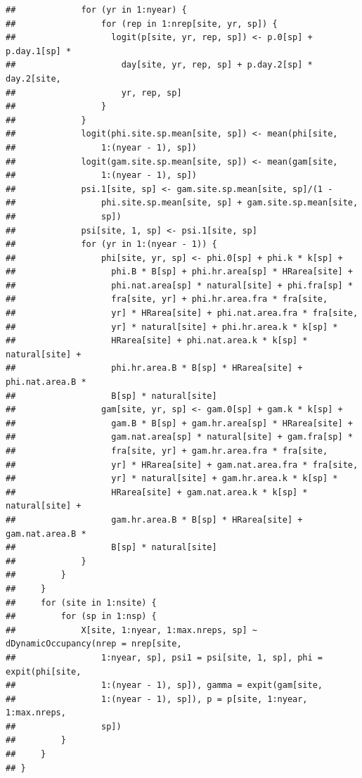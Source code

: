 \documentclass{article}\usepackage[]{graphicx}\usepackage[]{color}
\makeatletter
\newenvironment{kframe}{%
 \def\at@end@of@kframe{}%
 \ifinner\ifhmode%
  \def\at@end@of@kframe{\end{minipage}}%
  \begin{minipage}{\columnwidth}%
 \fi\fi%
 \def\FrameCommand##1{\hskip\@totalleftmargin \hskip-\fboxsep
 \colorbox{shadecolor}{##1}\hskip-\fboxsep
     \hskip-\linewidth \hskip-\@totalleftmargin \hskip\columnwidth}%
 \MakeFramed {\advance\hsize-\width
   \@totalleftmargin\z@ \linewidth\hsize
   \@setminipage}}%
 {\par\unskip\endMakeFramed%
 \at@end@of@kframe}
\newenvironment{knitrout}{}{} %
\makeatother
\begin{document}
\begin{knitrout}
\begin{kframe}
\begin{verbatim}
##             for (yr in 1:nyear) {
##                 for (rep in 1:nrep[site, yr, sp]) {
##                   logit(p[site, yr, rep, sp]) <- p.0[sp] + p.day.1[sp] * 
##                     day[site, yr, rep, sp] + p.day.2[sp] * day.2[site, 
##                     yr, rep, sp]
##                 }
##             }
##             logit(phi.site.sp.mean[site, sp]) <- mean(phi[site, 
##                 1:(nyear - 1), sp])
##             logit(gam.site.sp.mean[site, sp]) <- mean(gam[site, 
##                 1:(nyear - 1), sp])
##             psi.1[site, sp] <- gam.site.sp.mean[site, sp]/(1 - 
##                 phi.site.sp.mean[site, sp] + gam.site.sp.mean[site, 
##                 sp])
##             psi[site, 1, sp] <- psi.1[site, sp]
##             for (yr in 1:(nyear - 1)) {
##                 phi[site, yr, sp] <- phi.0[sp] + phi.k * k[sp] + 
##                   phi.B * B[sp] + phi.hr.area[sp] * HRarea[site] + 
##                   phi.nat.area[sp] * natural[site] + phi.fra[sp] * 
##                   fra[site, yr] + phi.hr.area.fra * fra[site, 
##                   yr] * HRarea[site] + phi.nat.area.fra * fra[site, 
##                   yr] * natural[site] + phi.hr.area.k * k[sp] * 
##                   HRarea[site] + phi.nat.area.k * k[sp] * natural[site] + 
##                   phi.hr.area.B * B[sp] * HRarea[site] + phi.nat.area.B * 
##                   B[sp] * natural[site]
##                 gam[site, yr, sp] <- gam.0[sp] + gam.k * k[sp] + 
##                   gam.B * B[sp] + gam.hr.area[sp] * HRarea[site] + 
##                   gam.nat.area[sp] * natural[site] + gam.fra[sp] * 
##                   fra[site, yr] + gam.hr.area.fra * fra[site, 
##                   yr] * HRarea[site] + gam.nat.area.fra * fra[site, 
##                   yr] * natural[site] + gam.hr.area.k * k[sp] * 
##                   HRarea[site] + gam.nat.area.k * k[sp] * natural[site] + 
##                   gam.hr.area.B * B[sp] * HRarea[site] + gam.nat.area.B * 
##                   B[sp] * natural[site]
##             }
##         }
##     }
##     for (site in 1:nsite) {
##         for (sp in 1:nsp) {
##             X[site, 1:nyear, 1:max.nreps, sp] ~ dDynamicOccupancy(nrep = nrep[site, 
##                 1:nyear, sp], psi1 = psi[site, 1, sp], phi = expit(phi[site, 
##                 1:(nyear - 1), sp]), gamma = expit(gam[site, 
##                 1:(nyear - 1), sp]), p = p[site, 1:nyear, 1:max.nreps, 
##                 sp])
##         }
##     }
## }
\end{verbatim}
\end{kframe}
\end{knitrout}
\end{document}
